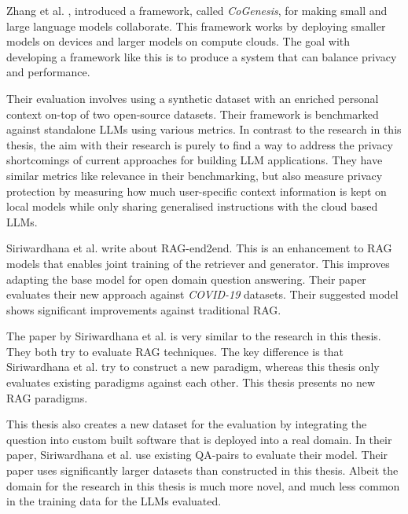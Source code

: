 

Zhang et al. \cite{zhang_cogenesis_2024}, introduced a framework, called \textit{CoGenesis}, for making small and large language models collaborate. This framework works by deploying smaller models on devices and larger models on compute clouds. The goal with developing a framework like this is to produce a system that can balance privacy and performance.


Their evaluation involves using a synthetic dataset with an enriched personal context on-top of two open-source datasets. Their framework is benchmarked against standalone \gls{LLM}s using various metrics. In contrast to the research in this thesis, the aim with their research is purely to find a way to address the privacy shortcomings of current approaches for building \gls{LLM} applications. They have similar metrics like relevance in their benchmarking, but also measure privacy protection by measuring how much user-specific context information is kept on local models while only sharing generalised instructions with the cloud based \gls{LLM}s.




Siriwardhana et al. \cite{siriwardhana_improving_2023} write about \gls{RAG}-end2end. This is an enhancement to \gls{RAG} models that enables joint training of the retriever and generator. This improves adapting the base model for open domain question answering. Their paper evaluates their new approach against \textit{COVID-19} datasets. Their suggested model shows significant improvements against traditional \gls{RAG}.


The paper by Siriwardhana et al. is very similar to the research in this thesis. They both try to evaluate \gls{RAG} techniques. The key difference is that Siriwardhana et al. try to construct a new paradigm, whereas this thesis only evaluates existing paradigms against each other. This thesis presents no new \gls{RAG} paradigms.


This thesis also creates a new dataset for the evaluation by integrating the question into custom built software that is deployed into a real domain. In their paper, Siriwardhana et al. use existing QA-pairs to evaluate their model. Their paper uses significantly larger datasets than constructed in this thesis. Albeit the domain for the research in this thesis is much more novel, and much less common in the training data for the \gls{LLM}s evaluated.


